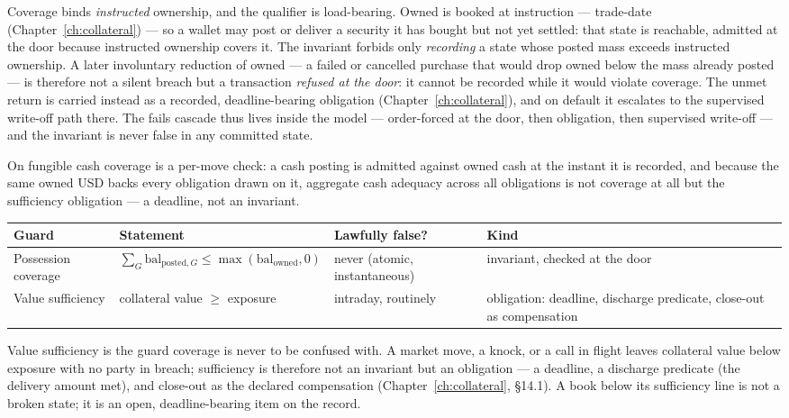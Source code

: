 Coverage binds \emph{instructed} ownership, and the qualifier is load-bearing. Owned is
booked at instruction --- trade-date (Chapter~\ref{ch:collateral}) --- so a wallet may
post or deliver a security it has bought but not yet settled: that state is reachable,
admitted at the door because instructed ownership covers it. The invariant forbids only
\emph{recording} a state whose posted mass exceeds instructed ownership. A later
involuntary reduction of owned --- a failed or cancelled purchase that would drop owned
below the mass already posted --- is therefore not a silent breach but a transaction
\emph{refused at the door}: it cannot be recorded while it would violate coverage. The
unmet return is carried instead as a recorded, deadline-bearing obligation
(Chapter~\ref{ch:collateral}), and on default it escalates to the supervised write-off
path there. The fails cascade thus lives inside the model --- order-forced at the door,
then obligation, then supervised write-off --- and the invariant is never false in any
committed state.

On fungible cash coverage is a per-move check: a cash posting is admitted against owned
cash at the instant it is recorded, and because the same owned USD backs every
obligation drawn on it, aggregate cash adequacy across all obligations is not coverage
at all but the sufficiency obligation --- a deadline, not an invariant.

\begin{center}
\begin{tabular}{@{}p{}p{}p{}p{}@{}}
\toprule
Guard & Statement & Lawfully false? & Kind \\
\midrule
Possession coverage & $\sum_G \mathrm{bal}_{\mathrm{posted},G} \le \max(\mathrm{bal}_{\mathrm{owned}},0)$ & never (atomic, instantaneous) & invariant, checked at the door \\
Value sufficiency & collateral value $\ge$ exposure & intraday, routinely & obligation: deadline, discharge predicate, close-out as compensation \\
\bottomrule
\end{tabular}
\end{center}

\noindent Value sufficiency is the guard coverage is never to be confused with. A
market move, a knock, or a call in flight leaves collateral value below exposure
with no party in breach; sufficiency is therefore not an invariant but an
obligation --- a deadline, a discharge predicate (the delivery amount met), and
close-out as the declared compensation (Chapter~\ref{ch:collateral}, \S 14.1). A
book below its sufficiency line is not a broken state; it is an open,
deadline-bearing item on the record.

